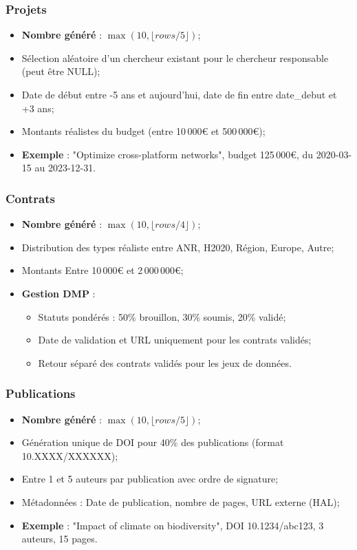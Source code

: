 \documentclass[12pt,a4paper]{article}
\begin{document}
\subsubsection{Projets}
\begin{itemize}
    \item \textbf{Nombre généré} : $\max(10, \lfloor rows/5 \rfloor)$;
    \item Sélection aléatoire d'un chercheur existant pour le chercheur responsable (peut être NULL);
    \item Date de début entre -5 ans et aujourd'hui, date de fin entre date\_debut et +3 ans;
    \item Montants réalistes du budget (entre 10\,000€ et 500\,000€);
    \item \textbf{Exemple} : "Optimize cross-platform networks", budget 125\,000€, du 2020-03-15 au 2023-12-31.
\end{itemize}

\subsubsection{Contrats}
\begin{itemize}
    \item \textbf{Nombre généré} : $\max(10, \lfloor rows/4 \rfloor)$;
    \item Distribution des types réaliste entre ANR, H2020, Région, Europe, Autre;
    \item Montants Entre 10\,000€ et 2\,000\,000€;
    \item \textbf{Gestion DMP} :
    \begin{itemize}
        \item Statuts pondérés : 50\% brouillon, 30\% soumis, 20\% validé;
        \item Date de validation et URL uniquement pour les contrats validés;
        \item Retour séparé des contrats validés pour les jeux de données.
    \end{itemize}
\end{itemize}

\subsubsection{Publications}
\begin{itemize}
    \item \textbf{Nombre généré} : $\max(10, \lfloor rows/5 \rfloor)$;
    \item Génération unique de DOI pour 40\% des publications (format 10.XXXX/XXXXXX);
    \item Entre 1 et 5 auteurs par publication avec ordre de signature;
    \item Métadonnées : Date de publication, nombre de pages, URL externe (HAL);
    \item \textbf{Exemple} : "Impact of climate on biodiversity", DOI 10.1234/abc123, 3 auteurs, 15 pages.
\end{itemize}
\end{document}
